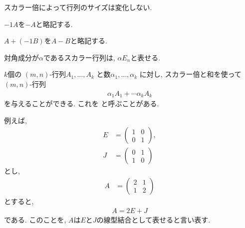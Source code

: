 \begin{remark}
  スカラー倍によって行列のサイズは変化しない.
\end{remark}
\begin{definition}
  $-1A$を$-A$と略記する.
\end{definition}

\begin{definition}
  $A+(-1B)$を$A-B$と略記する.
\end{definition}

\begin{remark}
  対角成分が$\alpha$であるスカラー行列は, $\alpha E_n$と表せる.
\end{remark}

\begin{definition}
  $k$個の
  $(m,n)$-行列$A_1,\ldots,A_k$
  と数$\alpha_1,\ldots,\alpha_k$
  に対し, スカラー倍と和を使って
  $(m,n)$-行列
  \begin{align*}
    \alpha_1A_1 + \cdots \alpha_kA_k
  \end{align*}
  を与えることができる.
  これを
 と呼ぶことがある.
\end{definition}
\begin{example}
  例えば,
  \begin{align*}
    E&=\begin{pmatrix}1&0\\0&1\end{pmatrix},\\
    J&=\begin{pmatrix}0&1\\1&0\end{pmatrix}
  \end{align*}
  とし,
  \begin{align*}
    A&=\begin{pmatrix}2&1\\1&2\end{pmatrix}
  \end{align*}
  とすると,
  \begin{align*}
    A=2E+J
  \end{align*}
  である.
  このことを,
  $A$は$E$と$J$の線型結合として表せると言い表す.
\end{example}


